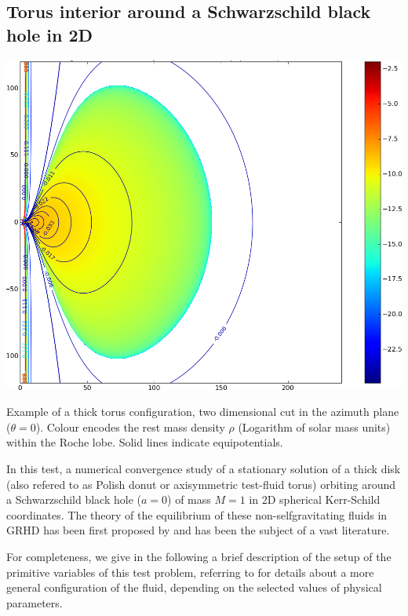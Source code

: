 \subsection{Torus interior around a Schwarzschild black hole in 2D}
\label{sec:2D_torus_interior}
\begin{marginfigure}[-1cm]
 \includegraphics[width=\textwidth]{sven-torus/logrho.png}
 \caption[
   Rest mass density in thick torus spacetime, Matplotlib, \exclusive
 ]{
   Example of a thick torus configuration, two dimensional cut in the
   azimuth plane ($\theta=0$).
   Colour encodes the rest mass density $\rho$ (Logarithm of solar
   mass units) within the Roche lobe. Solid lines indicate equipotentials.
 }
\end{marginfigure}
In this test, a numerical convergence study of a stationary solution of
a thick disk (also refered to as Polish donut or axisymmetric test-fluid
torus) orbiting around a Schwarzschild black hole ($a=0$) of mass $M=1$
in 2D spherical Kerr-Schild coordinates. The theory of the equilibrium of these
non-selfgravitating fluids in GRHD has been first proposed by
\cite{Abramowicz78, Kozlowski1978} and has been the subject of a vast
literature. 
{ For completeness, we give in the following a brief
description of the setup of the primitive
variables of this test problem, referring to
\cite{Font02a,Rezzolla_book:2013,Anton06,DelZanna2007} for details 
about a more
general configuration of the fluid, depending on the selected values of
physical parameters.
 
}

